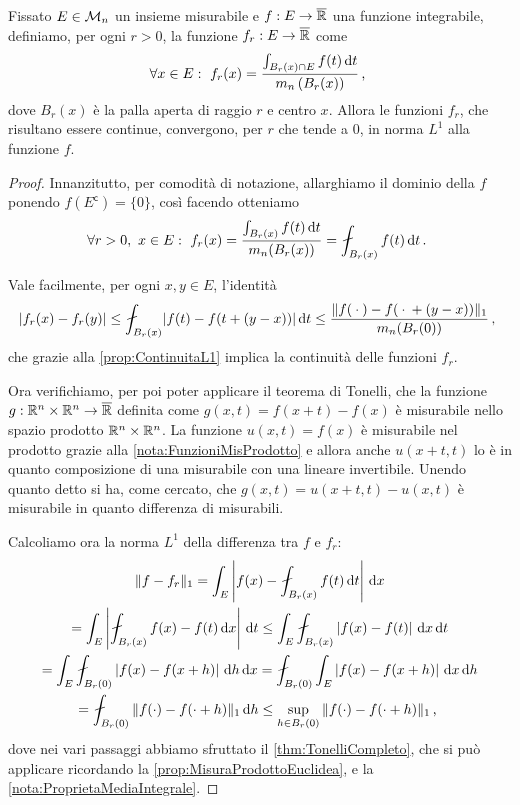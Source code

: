 \begin{lemma}\label{lemma:ContinuitaL1Palle}
	Fissato $E\in\mathcal M_n$ un insieme misurabile e $f:E\to\overline{\mathbb R}$ una funzione integrabile, definiamo, per ogni $r>0$, la funzione $f_r:E\to\overline{\mathbb R}$ come
	\begin{equation*}
		\forall x\in E:\ f_r(x)=\frac{\int_{B_r(x)\cap E}f(t)\,\mathrm d t}{m_n\left(B_r(x)\right)}\, \text{, }
	\end{equation*}
	dove $B_r(x)$ è la palla aperta di raggio $r$ e centro $x$.
	Allora le funzioni $f_r$, che risultano essere continue, convergono, per $r$ che tende a $0$, in norma $L^1$ alla funzione $f$.
\end{lemma}
\begin{proof}
	Innanzitutto, per comodità di notazione, allarghiamo il dominio della $f$ ponendo $f(E^{\mathsf c})=\{0\}$, così facendo otteniamo
	\begin{equation*}
		\forall r>0,\ x\in E:\ f_r(x)=\frac{\int_{B_r(x)}f(t)\de t}{m_n(B_r(x))}=\aint_{B_r(x)} f(t)\de t \punto
	\end{equation*}

	Vale facilmente, per ogni $x,y\in E$, l'identità
	\begin{equation*}
		\lvert f_r(x)-f_r(y)\rvert %
		\le \aint_{B_r(x)}\lvert f(t)-f(t+(y-x))\rvert \de t \le \frac{ \LNorm{f({}\cdot{})-f({}\cdot{}+(y-x))} }{ m_n(B_r(0)) } \virgola
	\end{equation*}
	che grazie alla \cref{prop:ContinuitaL1} implica la continuità delle funzioni $f_r$.
	
	Ora verifichiamo, per poi poter applicare il teorema di Tonelli, che la funzione $g:\mathbb R^n\times\mathbb R^n\to\overline{\mathbb R}$ definita come $g(x,t)=f(x+t)-f(x)$ è misurabile nello spazio prodotto $\mathbb R^n\times\mathbb R^n$. 
	La funzione $u(x,t)=f(x)$ è misurabile nel prodotto grazie alla \cref{nota:FunzioniMisProdotto} e allora anche $u(x+t,t)$ lo è in quanto composizione di una misurabile con una lineare invertibile. Unendo quanto detto si ha, come cercato, che $g(x,t)=u(x+t,t)-u(x,t)$ è misurabile in quanto differenza di misurabili.
	
	Calcoliamo ora la norma $L^1$ della differenza tra $f$ e $f_r$:
	\begin{multline}\label{eq:ContinuitaPalleDis}
		\LNorm{f-f_r}=\int_E \left\lvert f(x)-\aint_{B_r(x)}f(t)\de t\right\rvert\de x\\
		=\int_E\left\lvert\aint_{B_r(x)}f(x)-f(t)\de x\right\rvert\de t\le \int_E\aint_{B_r(x)}\left\lvert f(x)-f(t)\right\rvert\de x\de t\\
		=\int_E\aint_{B_r(0)}\left\lvert f(x)-f(x+h)\right\rvert\de h\de x
		=\aint_{B_r(0)}\int_E \left\lvert f(x)-f(x+h)\right\rvert\de x\de h\\
		= \aint_{B_r(0)}\LNorm{f(\cdot)-f(\cdot+h)}\de h\le \sup_{h\in B_r(0)} \LNorm{f(\cdot)-f(\cdot+h)}\virgola
	\end{multline}
	dove nei vari passaggi abbiamo sfruttato il \cref{thm:TonelliCompleto}, che si può applicare ricordando la \cref{prop:MisuraProdottoEuclidea}, e la \cref{nota:ProprietaMediaIntegrale}.
	

\end{proof}
